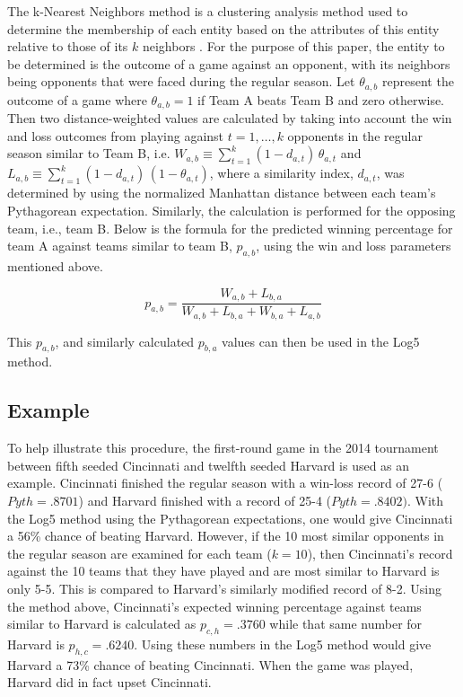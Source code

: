 \documentclass[5p, preprint]{elsarticle}
\begin{document}
The k-Nearest Neighbors method is a clustering analysis method used to determine the membership of each entity based on the attributes of this entity relative to those of its $k$ neighbors \cite{Dudani1976}. For the purpose of this paper, the entity to be determined is the outcome of a game against an opponent, with its neighbors being opponents that were faced during the regular season.  Let $\theta_{a,b}$ represent the outcome of a game where $\theta_{a,b}=1$ if Team A beats Team B and zero otherwise. Then two distance-weighted values are calculated by taking into account the win and loss outcomes from playing against $t=1,\ldots,k$ opponents in the regular season similar to Team B, i.e.  $W_{a,b} \equiv\sum_{t=1}^k{(1-d_{a,t}) \, \theta_{a,t}}$ and $L_{a,b} \equiv \sum_{t=1}^k{(1-d_{a,t}) \, (1 - \theta_{a,t})}$, where a similarity index, $d_{a,t}$, was determined by using the normalized Manhattan distance between each team's Pythagorean expectation. Similarly, the calculation is performed for the opposing team, i.e., team B. Below is the formula for the predicted winning percentage for team A against teams similar to team B, $p_{a,b}$, using the win and loss parameters mentioned above. 

\[
p_{a,b} = \frac{W_{a,b} + L_{b,a}}{W_{a,b} + L_{b,a} + W_{b,a} + L_{a,b}}
\]

This $p_{a,b}$, and similarly calculated $p_{b,a}$ values can then be used in the Log5 method.

\vspace*{-.1in}

\subsection*{Example}

To help illustrate this procedure, the first-round game in the 2014 tournament between fifth seeded Cincinnati and twelfth seeded Harvard is used as an example.  Cincinnati finished the regular season with a win-loss record of 27-6 ($Pyth = .8701$) and Harvard finished with a record of 25-4 ($Pyth = .8402)$. With the Log5 method using the Pythagorean expectations, one would give Cincinnati a 56\% chance of beating Harvard. However, if the 10 most similar opponents in the regular season are examined for each team ($k=10$), then Cincinnati's record against the 10 teams that they have played and are most similar to Harvard is only 5-5. This is compared to Harvard's similarly modified record of 8-2. Using the method above, Cincinnati's expected winning percentage against teams similar to Harvard is calculated as $p_{c,h} = .3760$ while that same number for Harvard is $p_{h,c} = .6240$. Using these numbers in the Log5 method would give Harvard a 73\% chance of beating Cincinnati.  When the game was played, Harvard did in fact upset Cincinnati.
\end{document}
